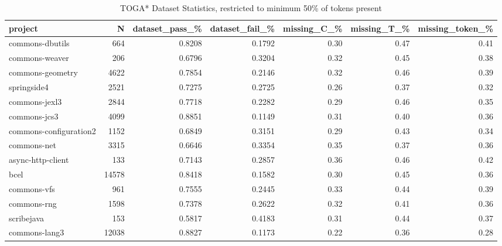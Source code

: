 \begin{table*}
\centering
\caption{TOGA* Dataset Statistics, restricted to minimum 50\% of tokens present}
\label{tab:toga_stats_50}
\begin{tabular}{lrrrrrr}
\toprule
                project &       N &  dataset\_pass\_\% &  dataset\_fail\_\% &  missing\_C\_\% &  missing\_T\_\% &  missing\_token\_\% \\
\midrule
        commons-dbutils &     664 &          0.8208 &          0.1792 &         0.30 &         0.47 &             0.41 \\
         commons-weaver &     206 &          0.6796 &          0.3204 &         0.32 &         0.45 &             0.38 \\
       commons-geometry &    4622 &          0.7854 &          0.2146 &         0.32 &         0.46 &             0.39 \\
            springside4 &    2521 &          0.7275 &          0.2725 &         0.26 &         0.37 &             0.32 \\
          commons-jexl3 &    2844 &          0.7718 &          0.2282 &         0.29 &         0.46 &             0.35 \\
           commons-jcs3 &    4099 &          0.8851 &          0.1149 &         0.31 &         0.40 &             0.36 \\
 commons-configuration2 &    1152 &          0.6849 &          0.3151 &         0.29 &         0.43 &             0.34 \\
            commons-net &    3315 &          0.6646 &          0.3354 &         0.35 &         0.37 &             0.36 \\
      async-http-client &     133 &          0.7143 &          0.2857 &         0.36 &         0.46 &             0.42 \\
                   bcel &   14578 &          0.8418 &          0.1582 &         0.30 &         0.45 &             0.36 \\
            commons-vfs &     961 &          0.7555 &          0.2445 &         0.33 &         0.44 &             0.39 \\
            commons-rng &    1598 &          0.7378 &          0.2622 &         0.32 &         0.41 &             0.36 \\
             scribejava &     153 &          0.5817 &          0.4183 &         0.31 &         0.44 &             0.37 \\
          commons-lang3 &   12038 &          0.8827 &          0.1173 &         0.22 &         0.36 &             0.28 \\

\end{tabular}
\end{table*}
